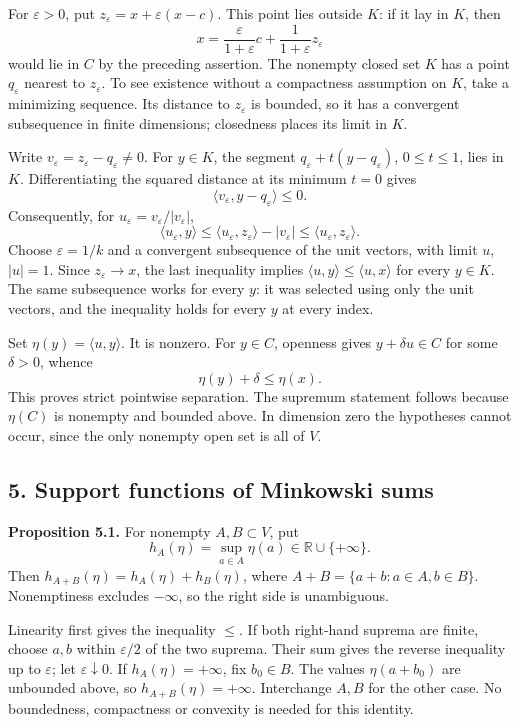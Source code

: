 \documentclass[
  11pt,
]{article}
\begin{document}
For \(\varepsilon>0\), put \(z_\varepsilon=x+\varepsilon(x-c)\). This
point lies outside \(K\): if it lay in \(K\), then \[
x=\frac{\varepsilon}{1+\varepsilon}c
 +\frac{1}{1+\varepsilon}z_\varepsilon
\] would lie in \(C\) by the preceding assertion. The nonempty closed
set \(K\) has a point \(q_\varepsilon\) nearest to \(z_\varepsilon\). To
see existence without a compactness assumption on \(K\), take a
minimizing sequence. Its distance to \(z_\varepsilon\) is bounded, so it
has a convergent subsequence in finite dimensions; closedness places its
limit in \(K\).

Write \(v_\varepsilon=z_\varepsilon-q_\varepsilon\ne0\). For \(y\in K\),
the segment \(q_\varepsilon+t(y-q_\varepsilon)\), \(0\leq t\leq1\), lies
in \(K\). Differentiating the squared distance at its minimum \(t=0\)
gives \[
\langle v_\varepsilon,y-q_\varepsilon\rangle\leq0.
\] Consequently, for \(u_\varepsilon=v_\varepsilon/|v_\varepsilon|\), \[
\langle u_\varepsilon,y\rangle
\leq\langle u_\varepsilon,z_\varepsilon\rangle
-|v_\varepsilon|
\leq\langle u_\varepsilon,z_\varepsilon\rangle.
\] Choose \(\varepsilon=1/k\) and a convergent subsequence of the unit
vectors, with limit \(u\), \(|u|=1\). Since \(z_\varepsilon\to x\), the
last inequality implies \(\langle u,y\rangle\leq\langle u,x\rangle\) for
every \(y\in K\). The same subsequence works for every \(y\): it was
selected using only the unit vectors, and the inequality holds for every
\(y\) at every index.

Set \(\eta(y)=\langle u,y\rangle\). It is nonzero. For \(y\in C\),
openness gives \(y+\delta u\in C\) for some \(\delta>0\), whence \[
\eta(y)+\delta\leq\eta(x).
\] This proves strict pointwise separation. The supremum statement
follows because \(\eta(C)\) is nonempty and bounded above. In dimension
zero the hypotheses cannot occur, since the only nonempty open set is
all of \(V\).

\subsection{5. Support functions of Minkowski
sums}\label{support-functions-of-minkowski-sums}

\textbf{Proposition 5.1.} For nonempty \(A,B\subset V\), put \[
h_A(\eta)=\sup_{a\in A}\eta(a)\in\mathbb R\cup\{+\infty\}.
\] Then \(h_{A+B}(\eta)=h_A(\eta)+h_B(\eta)\), where
\(A+B=\{a+b:a\in A,b\in B\}\). Nonemptiness excludes \(-\infty\), so the
right side is unambiguous.

Linearity first gives the inequality \(\leq\). If both right-hand
suprema are finite, choose \(a,b\) within \(\varepsilon/2\) of the two
suprema. Their sum gives the reverse inequality up to \(\varepsilon\);
let \(\varepsilon\downarrow0\). If \(h_A(\eta)=+\infty\), fix
\(b_0\in B\). The values \(\eta(a+b_0)\) are unbounded above, so
\(h_{A+B}(\eta)=+\infty\). Interchange \(A,B\) for the other case. No
boundedness, compactness or convexity is needed for this identity.
\end{document}

